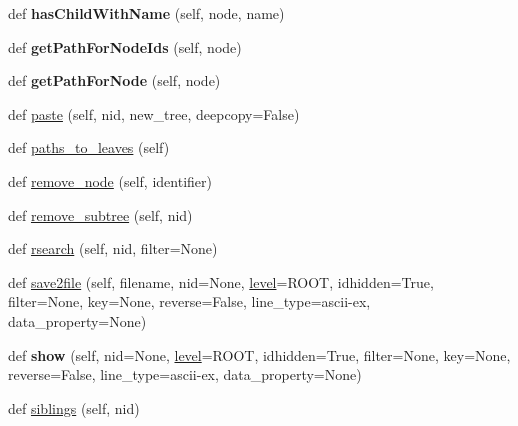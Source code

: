 \begin{DoxyCompactItemize}
\mbox{\label{classtreelib_1_1tree_1_1Tree_ac44405f0b498b6b6049bfc93571a267b}} 
def {\bfseries has\+Child\+With\+Name} (self, node, name)
\item 
\mbox{\label{classtreelib_1_1tree_1_1Tree_a07f3c6c1e5ed11fcf717f65c9819b914}} 
def {\bfseries get\+Path\+For\+Node\+Ids} (self, node)
\item 
\mbox{\label{classtreelib_1_1tree_1_1Tree_a6392656bfe734c5f13e7ae462cac8445}} 
def {\bfseries get\+Path\+For\+Node} (self, node)
\item 
def \mbox{\hyperlink{classtreelib_1_1tree_1_1Tree_a33742dae375dba44d958e6f34f97ef1d}{paste}} (self, nid, new\+\_\+tree, deepcopy=False)
\item 
def \mbox{\hyperlink{classtreelib_1_1tree_1_1Tree_a775b014905a41f6e2b17f80fdfcdb294}{paths\+\_\+to\+\_\+leaves}} (self)
\item 
def \mbox{\hyperlink{classtreelib_1_1tree_1_1Tree_aed9ee0821e87c9864e43e075c076f967}{remove\+\_\+node}} (self, identifier)
\item 
def \mbox{\hyperlink{classtreelib_1_1tree_1_1Tree_a539eabaac44a993d6be3ee7ab6b031aa}{remove\+\_\+subtree}} (self, nid)
\item 
def \mbox{\hyperlink{classtreelib_1_1tree_1_1Tree_a21bc133386f5610b9a9eb720823ca536}{rsearch}} (self, nid, filter=None)
\item 
def \mbox{\hyperlink{classtreelib_1_1tree_1_1Tree_afd71be661a3e735c629e1c533b444734}{save2file}} (self, filename, nid=None, \mbox{\hyperlink{classtreelib_1_1tree_1_1Tree_a4c1fa1eb04b6c8b4613a34425207c07e}{level}}=R\+O\+OT, idhidden=True, filter=None, key=None, reverse=False, line\+\_\+type=\textquotesingle{}ascii-\/ex\textquotesingle{}, data\+\_\+property=None)
\item 
\mbox{\label{classtreelib_1_1tree_1_1Tree_ae67f01b2e134a3a505a55e4f9c37994d}} 
def {\bfseries show} (self, nid=None, \mbox{\hyperlink{classtreelib_1_1tree_1_1Tree_a4c1fa1eb04b6c8b4613a34425207c07e}{level}}=R\+O\+OT, idhidden=True, filter=None, key=None, reverse=False, line\+\_\+type=\textquotesingle{}ascii-\/ex\textquotesingle{}, data\+\_\+property=None)
\item 
def \mbox{\hyperlink{classtreelib_1_1tree_1_1Tree_a9db8ff11f2c857dd552b43ce8b42459c}{siblings}} (self, nid)

\end{DoxyCompactItemize}
